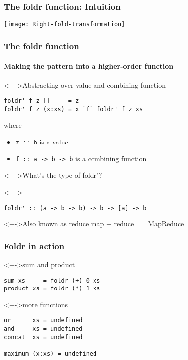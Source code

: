 \documentclass{beamer}
\begin{document}
\begin{frame}
  \frametitle{The foldr function: Intuition}
  \begin{center}
    \texttt{[image: Right-fold-transformation]}
  \end{center}
\end{frame}
\begin{frame}[fragile]
  \frametitle{The foldr function}
  \framesubtitle{Making the pattern into a higher-order function}
  \begin{block}<+->{Abstracting over value and combining function}
\begin{verbatim}
foldr' f z []     = z
foldr' f z (x:xs) = x `f` foldr' f z xs
\end{verbatim}
    where
    \begin{itemize}
    \item \texttt{z :: b} is a value
    \item \texttt{f :: a -> b -> b} is a combining function
    \end{itemize}
  \end{block}
  \begin{alertblock}<+->{What's the type of foldr'?}
    \vspace{-\baselineskip}
  \end{alertblock}
  \begin{block}<+->{}
\begin{verbatim}
foldr' :: (a -> b -> b) -> b -> [a] -> b
\end{verbatim}
  \end{block}
  \begin{alertblock}<+->{Also known as reduce}
    map $+$ reduce $=$ \href{https://en.wikipedia.org/wiki/MapReduce}{MapReduce}
  \end{alertblock}
\end{frame}
\begin{frame}[fragile]
  \frametitle{Foldr in action}
  \begin{block}<+->{sum and product}
\begin{verbatim}
sum xs     = foldr (+) 0 xs
product xs = foldr (*) 1 xs
\end{verbatim}
  \end{block}
  \begin{block}<+->{more functions}
\begin{verbatim}
or      xs = undefined
and     xs = undefined
concat  xs = undefined

maximum (x:xs) = undefined
\end{verbatim}
  \end{block}
\end{frame}
\end{document}
